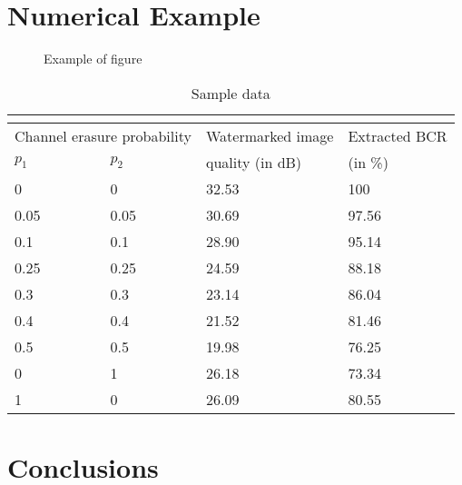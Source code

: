 \documentclass[12pt,a4paper]{jihmsp}
\begin{document}
	\section{Numerical Example}
	
	\begin{figure}[htbp]
		\begin{center}
			\caption{Example of figure}
			\label{fig1}
		\end{center}
	\end{figure}
	
	\begin{table}[htbp]
		\caption{Sample data}
		\label{table1}
		\begin{center}
			\begin{tabular}{|p{1.7cm}|p{1.7cm}||p{3cm}|p{3cm}|}
				\multicolumn{4}{c}{\vspace*{-1.3em}}\\
				\hline %
				\multicolumn{2}{|c||}{\scriptsize{Channel erasure probability}} & %
				\multicolumn{1}{l|}{Watermarked image} & %
				\multicolumn{1}{l|}{Extracted BCR\index{Bit Correct Rates (BCR)}} \\
				\cline{1-2} %
				\multicolumn{1}{|l|}{\(p_1\)} & \multicolumn{1}{l||}{\(p_2\)} &
				\multicolumn{1}{l|}{quality (in dB)\index{PSNR}} &
				\multicolumn{1}{l|}{(in \%)} \\
				\hline \hline %
				{0} & {0} & 32.53 & 100  \\
				\hline %
				{0.05} & {0.05} & 30.69 & 97.56\\
				\hline %
				{0.1} & {0.1} & 28.90 & 95.14  \\
				\hline %
				{0.25} & {0.25} & 24.59 & 88.18 \\
				\hline %
				{0.3} & {0.3} & 23.14 & 86.04 \\
				\hline %
				{0.4} & {0.4} & 21.52 & 81.46 \\
				\hline %
				{0.5} & {0.5} & 19.98 & 76.25  \\
				\hline %
				\hline %
				0 & 1 & 26.18 & 73.34 \\
				\hline %
				1 & 0 & 26.09 & 80.55  \\
				\hline %
			\end{tabular}
		\end{center}
	\end{table}
	
	
	\section {Conclusions}
	
\end{document}
